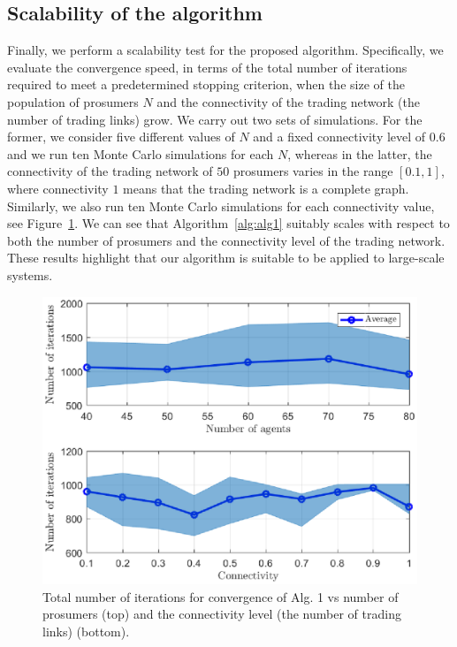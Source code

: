 \documentclass{IEEEtran}  %
\newcommand{\0}{\mathbf{0}}
\newcommand{\1}{\mathbf{1}}
\begin{document}

\subsection{Scalability of the algorithm}
Finally, we perform a scalability test for the proposed algorithm. Specifically, we evaluate the convergence speed, in terms of the total number of iterations required to meet a predetermined stopping criterion, when the size of the population of prosumers $N$ and the connectivity of the trading network (the number of trading links) grow. We carry out two sets of simulations.
%
For the former, we consider five different values of $N$ and a fixed connectivity level of $0.6$ and we run ten Monte Carlo simulations for each $N$, whereas in the latter, the connectivity of the trading network of $50$ prosumers varies in the range $[0.1,1]$, where connectivity $1$ means that the trading network is a complete graph. Similarly, we also run ten Monte Carlo simulations for each connectivity value, see
Figure~\ref{fig:simE}. We can see that Algorithm~\ref{alg:alg1} suitably scales with respect to both the number of prosumers and the connectivity level of the trading network. These results highlight that our algorithm is suitable to be applied to  large-scale systems. 

\begin{figure}[t]
	\centering
	\includegraphics[width=1\linewidth]{figures/simEF1.eps}
	\caption{Total number of iterations for convergence of Alg. 1 vs number of prosumers (top) and the connectivity level (the number of trading links) (bottom). 
	}
	\label{fig:simE}
\end{figure}
\end{document}
